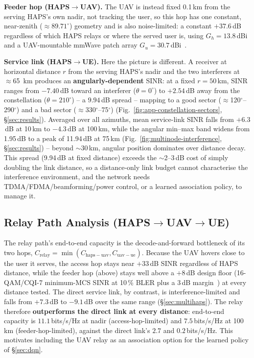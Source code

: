 \documentclass[]{ieeeaccess}
\begin{document}
\textbf{Feeder hop (HAPS$\to$UAV).} The UAV is instead fixed 0.1\,km from the serving HAPS's own nadir, not tracking the user, so this hop has one constant, near-zenith ($\approx89.71^\circ$) geometry and is also noise-limited: a constant $+37.6$\,dB regardless of which HAPS relays or where the served user is, using $G_h=13.8$\,dBi and a UAV-mountable mmWave patch array $G_u=30.7$\,dBi~\cite{anim2021uav}.

\textbf{Service link (HAPS$\to$UE).} Here the picture is different. A receiver at horizontal distance $r$ from the serving HAPS's nadir and the two interferers at $\approx$65~km produces an \textbf{angularly-dependent} SINR: at a fixed $r=50$\,km, SINR ranges from $-7.40$\,dB toward an interferer ($\theta=0^\circ$) to $+2.54$\,dB away from the constellation ($\theta=210^\circ$) -- a $9.94$\,dB spread -- mapping to a good sector ($\approx$120$^\circ$--290$^\circ$) and a bad sector ($\approx$330$^\circ$--75$^\circ$) (Fig.~\ref{fig:app-constellation-sectors}, \S\ref{sec:results}). Averaged over all azimuths, mean service-link SINR falls from $+6.3$\,dB at 10\,km to $-4.3$\,dB at 100\,km, while the angular min--max band widens from 1.95\,dB to a peak of 11.94\,dB at 75\,km (Fig.~\ref{fig:multinode-interference}, \S\ref{sec:results}) -- beyond $\sim$30\,km, angular position dominates over distance decay. This spread (9.94\,dB at fixed distance) exceeds the $\sim$2--3\,dB cost of simply doubling the link distance, so a distance-only link budget cannot characterise the interference environment, and the network needs TDMA/FDMA/beamforming/power control, or a learned association policy, to manage it.

\subsection{Relay Path Analysis (HAPS$\to$UAV$\to$UE)}
\label{sec:relay-path-analysis}

The relay path's end-to-end capacity is the decode-and-forward bottleneck of its two hops, $C_\mathrm{relay}=\min(C_\mathrm{haps-uav},C_\mathrm{uav-ue})$. Because the UAV hovers close to the user it serves, the access hop stays near $+33$\,dB SINR regardless of HAPS distance, while the feeder hop (above) stays well above a $+8$\,dB design floor (16-QAM/CQI-7 minimum-MCS SINR at 10\,\% BLER plus a 3\,dB margin~\cite{3gpp_ts38214}) at every distance tested. The direct service link, by contrast, is interference-limited and falls from $+7.3$\,dB to $-9.1$\,dB over the same range (\S\ref{sec:multihaps}). The relay therefore \textbf{outperforms the direct link at every distance}: end-to-end capacity is $11.1$\,bits/s/Hz at nadir (access-hop-limited) and $7.5$\,bits/s/Hz at 100\,km (feeder-hop-limited), against the direct link's $2.7$ and $0.2$\,bits/s/Hz. This motivates including the UAV relay as an association option for the learned policy of \S\ref{sec:dqn}.
\end{document}

